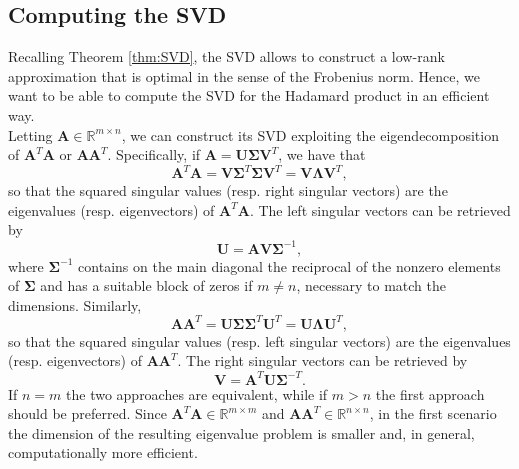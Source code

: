 \documentclass[10pt,titlepage]{article}
\numberwithin{equation}{section}
\numberwithin{figure}{section}
\begin{document}
\subsection{Computing the SVD}
Recalling Theorem \ref{thm:SVD}, the SVD allows to construct a low-rank approximation that is optimal in the sense of the Frobenius norm. Hence, we want to be able to compute the SVD for the Hadamard product in an efficient way. \\
Letting $\mathbf{A} \in \mathbb{R}^{m \times n}$, we can construct its SVD exploiting the eigendecomposition of $\mathbf{A}^T \mathbf{A}$ or  $\mathbf{A} \mathbf{A}^T$. Specifically, if $\mathbf{A}=\mathbf{U} \mathbf{\Sigma} \mathbf{V}^T$, we have that
\begin{equation}
	\mathbf{A}^T \mathbf{A}=\mathbf{V} \mathbf{\Sigma}^T \mathbf{\Sigma} \mathbf{V}^T=\mathbf{V} \mathbf{\Lambda} \mathbf{V}^T,
\end{equation}
so that the squared singular values (resp. right singular vectors) are the eigenvalues (resp. eigenvectors) of $\mathbf{A}^T \mathbf{A}$. The left singular vectors can be retrieved by 
\begin{equation}
	\mathbf{U}=\mathbf{A} \mathbf{V} \mathbf{\Sigma}^{-1},
	\label{eqn:retrieve_U}
\end{equation}
where $\mathbf{\Sigma}^{-1}$ contains on the main diagonal the reciprocal of the nonzero elements of $\mathbf{\Sigma}$ and has a suitable block of zeros if $m \neq n$, necessary to match the dimensions. Similarly, 
\begin{equation}
\mathbf{A} \mathbf{A}^T=\mathbf{U} \mathbf{\Sigma} \mathbf{\Sigma}^T \mathbf{U}^T=\mathbf{U} \mathbf{\Lambda} \mathbf{U}^T,
\end{equation}
so that the squared singular values (resp. left singular vectors) are the eigenvalues (resp. eigenvectors) of $\mathbf{A} \mathbf{A}^T$. The right singular vectors can be retrieved by 
\begin{equation}
	\mathbf{V}=\mathbf{A}^T \mathbf{U} \mathbf{\Sigma}^{-T}.
	\label{eqn:retrieve_V}
\end{equation}
If $n=m$ the two approaches are equivalent, while if $m>n$ the first approach should be preferred. Since $\mathbf{A}^T \mathbf{A} \in \mathbb{R}^{m \times m}$ and $\mathbf{A} \mathbf{A}^T \in \mathbb{R}^{n \times n}$, in the first scenario the dimension of the resulting eigenvalue problem is smaller and, in general, computationally more efficient. \\
\end{document}
